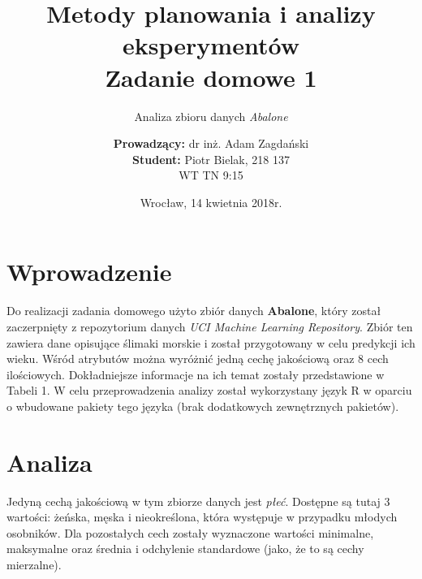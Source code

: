 \documentclass{scrartcl}
\title{Metody planowania i analizy eksperymentów\\Zadanie domowe 1}
\subtitle{Analiza zbioru danych \textit{Abalone}}
\author{\textbf{Prowadzący:} dr inż. Adam Zagdański \\ 
        \textbf{Student:} Piotr Bielak, 218 137\\WT TN 9:15}
\date{Wrocław, 14 kwietnia 2018r.}
\begin{document}
\maketitle

\section{Wprowadzenie}
Do realizacji zadania domowego użyto zbiór danych \textbf{Abalone}, który został
zaczerpnięty z repozytorium danych \textit{UCI Machine Learning Repository}. 
Zbiór ten zawiera dane opisujące ślimaki morskie i został przygotowany w celu 
predykcji ich wieku. Wśród atrybutów można wyróżnić jedną cechę jakościową oraz 
8 cech ilościowych. Dokładniejsze informacje na ich temat zostały przedstawione
w Tabeli 1. W celu przeprowadzenia analizy został wykorzystany język R w oparciu
o wbudowane pakiety tego języka (brak dodatkowych zewnętrznych pakietów).

\section{Analiza}
  Jedyną cechą jakościową w tym zbiorze danych jest \textit{płeć}. Dostępne są 
  tutaj 3 wartości: żeńska, męska i nieokreślona, która występuje w przypadku
  młodych osobników. Dla pozostałych cech zostały wyznaczone wartości minimalne,
  maksymalne oraz średnia i odchylenie standardowe (jako, że to są cechy mierzalne).
\end{document}
